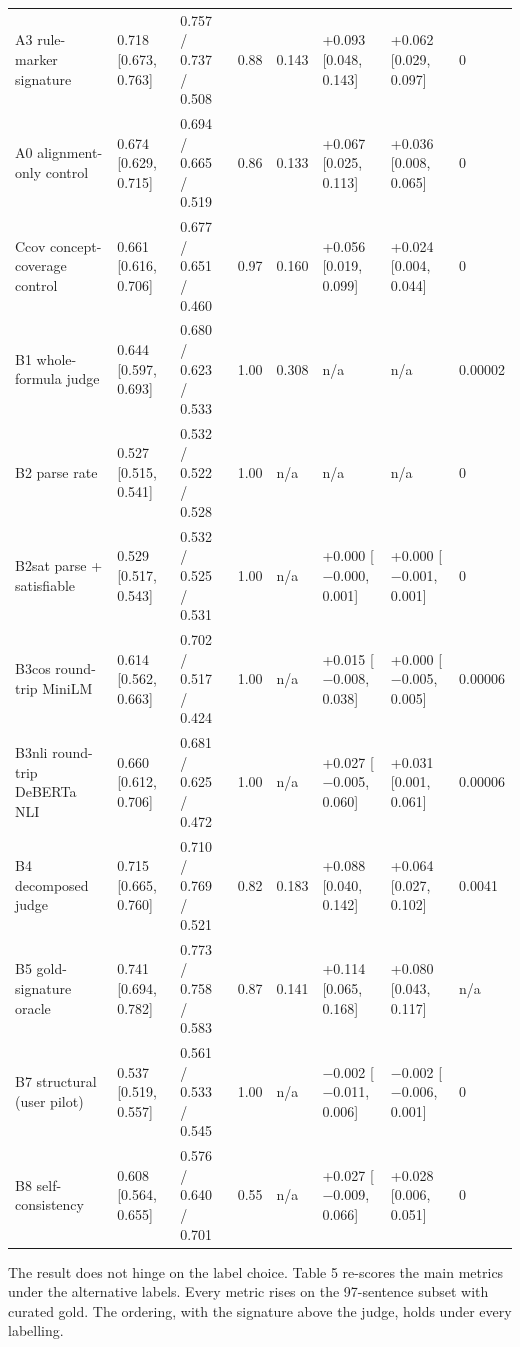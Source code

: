 \documentclass[11pt,letterpaper]{article}
\begin{document}
{\begin{longtable}
{}A3 rule-marker signature & 0.718 [0.673, 0.763] & 0.757 / 0.737 / 0.508 & 0.88 & 0.143 & +0.093 [0.048, 0.143] & +0.062 [0.029, 0.097] & 0 \\
{}A0 alignment-only control & 0.674 [0.629, 0.715] & 0.694 / 0.665 / 0.519 & 0.86 & 0.133 & +0.067 [0.025, 0.113] & +0.036 [0.008, 0.065] & 0 \\
{}Ccov concept-coverage control & 0.661 [0.616, 0.706] & 0.677 / 0.651 / 0.460 & 0.97 & 0.160 & +0.056 [0.019, 0.099] & +0.024 [0.004, 0.044] & 0 \\
{}B1 whole-formula judge & 0.644 [0.597, 0.693] & 0.680 / 0.623 / 0.533 & 1.00 & 0.308 & n/a & n/a & 0.00002 \\
{}B2 parse rate & 0.527 [0.515, 0.541] & 0.532 / 0.522 / 0.528 & 1.00 & n/a & n/a & n/a & 0 \\
{}B2sat parse + satisfiable & 0.529 [0.517, 0.543] & 0.532 / 0.525 / 0.531 & 1.00 & n/a & +0.000 [$-$0.000, 0.001] & +0.000 [$-$0.001, 0.001] & 0 \\
{}B3cos round-trip MiniLM & 0.614 [0.562, 0.663] & 0.702 / 0.517 / 0.424 & 1.00 & n/a & +0.015 [$-$0.008, 0.038] & +0.000 [$-$0.005, 0.005] & 0.00006 \\
{}B3nli round-trip DeBERTa NLI & 0.660 [0.612, 0.706] & 0.681 / 0.625 / 0.472 & 1.00 & n/a & +0.027 [$-$0.005, 0.060] & +0.031 [0.001, 0.061] & 0.00006 \\
{}B4 decomposed judge & 0.715 [0.665, 0.760] & 0.710 / 0.769 / 0.521 & 0.82 & 0.183 & +0.088 [0.040, 0.142] & +0.064 [0.027, 0.102] & 0.0041 \\
{}B5 gold-signature oracle & 0.741 [0.694, 0.782] & 0.773 / 0.758 / 0.583 & 0.87 & 0.141 & +0.114 [0.065, 0.168] & +0.080 [0.043, 0.117] & n/a \\
{}B7 structural (user pilot) & 0.537 [0.519, 0.557] & 0.561 / 0.533 / 0.545 & 1.00 & n/a & $-$0.002 [$-$0.011, 0.006] & $-$0.002 [$-$0.006, 0.001] & 0 \\
{}B8 self-consistency & 0.608 [0.564, 0.655] & 0.576 / 0.640 / 0.701 & 0.55 & n/a & +0.027 [$-$0.009, 0.066] & +0.028 [0.006, 0.051] & 0 \\
\end{longtable}
}

The result does not hinge on the label choice. Table 5 re-scores the main metrics under the alternative labels. Every metric rises on the 97-sentence subset with curated gold. The ordering, with the signature above the judge, holds under every labelling.
\end{document}
